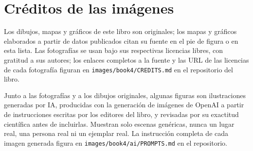 \chapter*{Créditos de las imágenes}

Los dibujos, mapas y gráficos de este libro son originales; los mapas y gráficos
elaborados a partir de datos publicados citan su fuente en el pie de figura o en
esta lista. Las fotografías se usan bajo sus respectivas licencias libres, con
gratitud a sus autores; los enlaces completos a la fuente y las URL de las
licencias de cada fotografía figuran en \texttt{images/book4/CREDITS.md} en el
repositorio del libro.

\bigskip
Junto a las fotografías y a los dibujos originales, algunas figuras son
ilustraciones generadas por IA, producidas con la generación de imágenes de OpenAI
a partir de instrucciones escritas por los editores del libro, y revisadas por su
exactitud científica antes de incluirlas. Muestran solo escenas genéricas, nunca un
lugar real, una persona real ni un ejemplar real. La instrucción completa de cada
imagen generada figura en \texttt{images/book4/ai/PROMPTS.md} en el repositorio.

